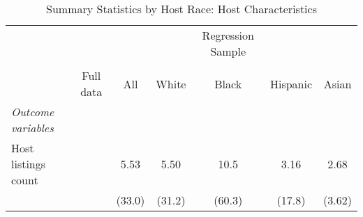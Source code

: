 {
	\begin{longtable}{l*{6}{c}}
		\caption{Summary Statistics by Host Race: Host Characteristics}\\
		
		\hline
		&\multicolumn{1}{c}{}&\multicolumn{1}{c}{}&\multicolumn{1}{c}{}&\multicolumn{1}{c}{Regression Sample}&\multicolumn{1}{c}{}&\multicolumn{1}{c}{}\\
		\cline{3-7}\\
			&\multicolumn{1}{c}{Full data}&\multicolumn{1}{c}{All}&\multicolumn{1}{c}{White}&\multicolumn{1}{c}{Black}&\multicolumn{1}{c}{Hispanic}&\multicolumn{1}{c}{Asian}\\
		\hline\hline           
		     
		\textit{Outcome variables} \\
		Host listings count         & &      5.53&      5.50 &      10.5&    3.16 & 2.68\\
		&	&     (33.0)         &     (31.2)         &     (60.3)         &     (17.8) & 	(3.62)         \\
		

\end{longtable}}

